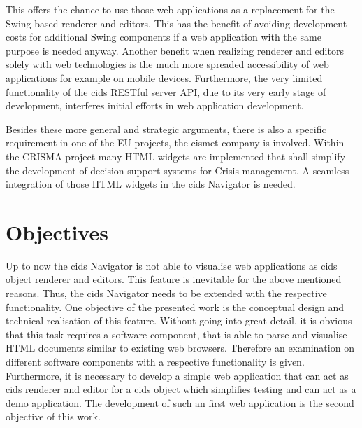 This offers the chance to use those web applications as a replacement for the Swing based renderer and editors.
This has the benefit of avoiding development costs for additional Swing components if a web application with the same purpose is needed anyway.
Another benefit when realizing renderer and editors solely with web technologies is the much more spreaded accessibility of web applications for example on mobile devices. 
Furthermore, the very limited functionality of the cids RESTful server API, due to its very early stage of development, interferes initial efforts in web application development.
 
Besides these more general and strategic arguments, there is also a specific requirement in one of the EU projects, the cismet company is involved.
Within the CRISMA project many HTML widgets are implemented that shall simplify the development of decision support systems for Crisis management.
A seamless integration of those HTML widgets in the cids Navigator is needed.

\section{Objectives}\label{chap:intro-objectives}

Up to now the cids Navigator is not able to visualise web applications as cids object renderer and editors.
This feature is inevitable for the above mentioned reasons.
Thus, the cids Navigator needs to be extended with the respective functionality.
One objective of the presented work is the conceptual design and technical realisation of this feature.
Without going into great detail, it is obvious that this task requires a software component, that is able to parse and visualise HTML documents similar to existing web browsers.
Therefore an examination on different software components with a respective functionality is given.
Furthermore, it is necessary to develop a simple web application that can act as cids renderer and editor for a cids object which simplifies testing and can act as a demo application.
The development of such an first web application is the second objective of this work.

